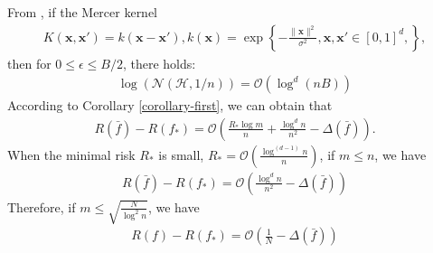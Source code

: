 \documentclass{article}
\begin{document}
From \cite{zhou2002covering}, if the Mercer kernel
\begin{align*}
  K(\mathbf x,\mathbf x')=k(\mathbf x-\mathbf x'), k(\mathbf x)=\exp\left\{-\frac{\|\mathbf x\|^2}{\sigma^2}, \mathbf x,\mathbf x' \in[0,1]^d, \right\},
\end{align*}
then for $0\leq \epsilon\leq B/2$, there holds:
\begin{align*}
 \log \left(\mathcal{N}(\mathcal{H},1/n)\right)=\mathcal{O}\left(\log^d(nB)\right)
\end{align*}
According to Corollary \ref{corollary-first}, we can obtain that
\begin{align*}
  R(\bar{f})-R(f_\ast)=\mathcal{O}\left(\frac{R_\ast\log m}{n}+\frac{\log^d n}{n^2}-
  \Delta(\bar{f})\right).
\end{align*}
When  the minimal risk  $R_\ast$ is small, $R_\ast=\mathcal{O}\left(\frac{\log^{(d-1)}n}{n}\right)$,
if $m\leq n$, we have
\begin{align*}
  R(\bar{f})-R(f_\ast)=\mathcal{O}\left(\frac{\log^d n}{n^2}-
  \Delta(\bar{f})\right)
\end{align*}
Therefore, if $m\leq \sqrt{\frac{N}{\log^2 n}}$,
we have
\begin{align*}
     R(f)-R(f_\ast)=\mathcal{O}\left(\frac{1}{N}-\Delta(\bar{f})\right)
\end{align*}
\end{document}
